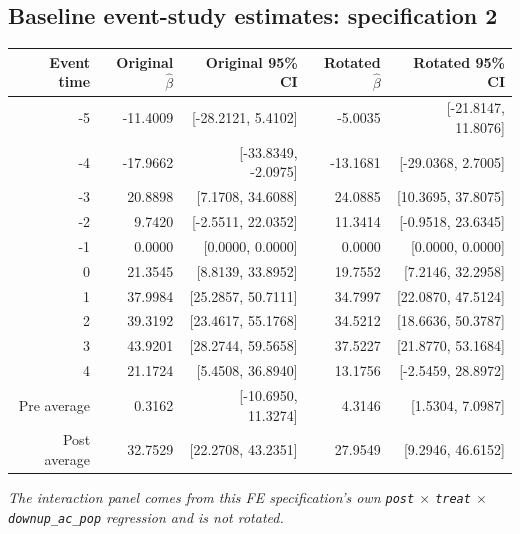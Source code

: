 \documentclass[10pt]{article}
\begin{document}
\subsection*{Baseline event-study estimates: specification 2}
\begin{center}
\scriptsize
\begin{tabular}{r rr rr}
\toprule
Event time & Original $\hat\beta$ & Original 95\% CI & Rotated $\hat\beta$ & Rotated 95\% CI \\
\midrule
-5 & -11.4009 & [-28.2121, 5.4102] & -5.0035 & [-21.8147, 11.8076] \\
-4 & -17.9662 & [-33.8349, -2.0975] & -13.1681 & [-29.0368, 2.7005] \\
-3 & 20.8898 & [7.1708, 34.6088] & 24.0885 & [10.3695, 37.8075] \\
-2 & 9.7420 & [-2.5511, 22.0352] & 11.3414 & [-0.9518, 23.6345] \\
-1 & 0.0000 & [0.0000, 0.0000] & 0.0000 & [0.0000, 0.0000] \\
0 & 21.3545 & [8.8139, 33.8952] & 19.7552 & [7.2146, 32.2958] \\
1 & 37.9984 & [25.2857, 50.7111] & 34.7997 & [22.0870, 47.5124] \\
2 & 39.3192 & [23.4617, 55.1768] & 34.5212 & [18.6636, 50.3787] \\
3 & 43.9201 & [28.2744, 59.5658] & 37.5227 & [21.8770, 53.1684] \\
4 & 21.1724 & [5.4508, 36.8940] & 13.1756 & [-2.5459, 28.8972] \\
\midrule
Pre average & 0.3162 & [-10.6950, 11.3274] & 4.3146 & [1.5304, 7.0987] \\
Post average & 32.7529 & [22.2708, 43.2351] & 27.9549 & [9.2946, 46.6152] \\
\bottomrule
\end{tabular}
\end{center}
\medskip
\textit{The interaction panel comes from this FE specification's own \texttt{post} $\times$ \texttt{treat} $\times$ \texttt{downup\_ac\_pop} regression and is not rotated.}
\clearpage
\end{document}
